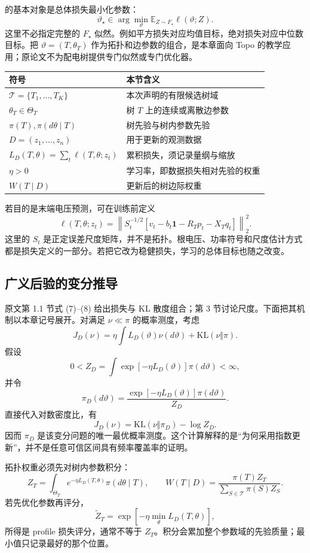 \documentclass[UTF8,11pt,fontset=fandol,openany,oneside]{ctexbook}
\theoremstyle{definition}
\theoremstyle{remark}
\numberwithin{equation}{chapter}
\begin{document}
\citet{S14} 的基本对象是总体损失最小化参数：
\[
 \vartheta_\star\in\arg\min_{\vartheta}
 \mathbb E_{Z\sim F_\star}\ell(\vartheta;Z).
\]
这里不必指定完整的 $F_\star$ 似然。例如平方损失对应均值目标，绝对损失对应中位数目标。把 $\vartheta=(T,\theta_T)$ 作为拓扑和边参数的组合，是本章面向 Topo 的教学应用；原论文不为配电树提供专门似然或专门优化器。

\begin{center}
\begin{tabularx}{\linewidth}{lX}
\toprule
符号 & 本节含义\\
\midrule
$\mathcal T=\{T_1,\ldots,T_K\}$ & 本次声明的有限候选树域\\
$\theta_T\in\Theta_T$ & 树 $T$ 上的连续或离散边参数\\
$\pi(T),\pi(d\theta\mid T)$ & 树先验与树内参数先验\\
$D=(z_1,\ldots,z_n)$ & 用于更新的观测数据\\
$L_D(T,\theta)=\sum_t\ell(T,\theta;z_t)$ & 累积损失，须记录量纲与缩放\\
$\eta>0$ & 学习率，即数据损失相对先验的权重\\
$W(T\mid D)$ & 更新后的树边际权重\\
\bottomrule
\end{tabularx}
\end{center}

若目的是末端电压预测，可在训练前定义
\[
 \ell(T,\theta;z_t)=
 \left\|S_t^{-1/2}
 [v_t-b_t\mathbf1-R_Tp_t-X_Tq_t]\right\|_2^2.
\]
这里的 $S_t$ 是正定误差尺度矩阵，并不是拓扑。根电压、功率符号和尺度估计方式都是损失定义的一部分。若把它改为稳健损失，学习的总体目标也随之改变。

\subsection{广义后验的变分推导}

原文第 1.1 节式 (7)--(8) 给出损失与 KL 散度组合；第 3 节讨论尺度。下面把其机制以本章记号展开。对满足 $\nu\ll\pi$ 的概率测度，考虑
\[
 J_D(\nu)=\eta\int L_D(\vartheta)\nu(d\vartheta)
               +\mathrm{KL}(\nu\Vert\pi).
\]
假设
\[
 0<Z_D=\int \exp[-\eta L_D(\vartheta)]\pi(d\vartheta)<\infty,
\]
并令
\[
 \pi_D(d\vartheta)=
 \frac{\exp[-\eta L_D(\vartheta)]\pi(d\vartheta)}{Z_D}.
\]
直接代入对数密度比，有
\[
 J_D(\nu)=\mathrm{KL}(\nu\Vert\pi_D)-\log Z_D.
\]
因而 $\pi_D$ 是该变分问题的唯一最优概率测度。这个计算解释的是“为何采用指数更新”，并不是任意可信区间具有频率覆盖率的证明。

拓扑权重必须先对树内参数积分：
\begin{equation}
 Z_T=\int_{\Theta_T}e^{-\eta L_D(T,\theta)}\pi(d\theta\mid T),
 \qquad
 W(T\mid D)=\frac{\pi(T)Z_T}{\sum_{S\in\mathcal T}\pi(S)Z_S}.
 \label{eq:textbook-S14-integral}
\end{equation}
若先优化参数再评分，
\[
 \widetilde Z_T=\exp[-\eta\min_{\theta}L_D(T,\theta)],
\]
所得是 profile 损失评分，通常不等于 $Z_T$。积分会累加整个参数域的先验质量；最小值只记录最好的那个位置。
\end{document}
